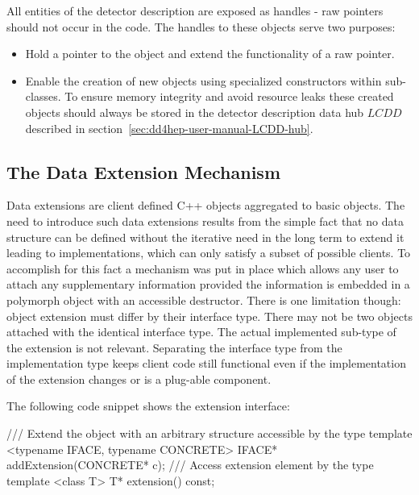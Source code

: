 \documentclass[10pt,a4paper]{article}
\begin{document}
\noindent
All entities of the \DDhep detector description are exposed as handles - 
raw pointers should not occur in the code. 
The handles to these objects serve two purposes:
\begin{itemize}\itemcompact
\item Hold a pointer to the object and extend the functionality of a raw
    pointer.
\item Enable the creation of new objects using specialized constructors
    within sub-classes. To ensure memory integrity and avoid resource 
    leaks these created objects should always be stored in the 
    detector description data hub $LCDD$ described in 
    section~\ref{sec:dd4hep-user-manual-LCDD-hub}.
\end{itemize}

\newpage
\subsection{The Data Extension Mechanism}
\label{sec:dd4hep-user-manual-data-extensions}
\noindent
Data extensions are client defined C++ objects aggregated to basic \DDhep objects.
The need to introduce such data extensions results from the simple fact that
no data structure can be defined without the iterative need in the long term
to extend it leading to implementations, which can only satisfy a subset of 
possible clients. To accomplish for this fact a mechanism was put in place
which allows any user to attach any supplementary information provided
the information is embedded in a polymorph object with an accessible destructor.
There is one limitation though: object extension must differ by their 
interface type. 
There may not be two objects attached with the identical interface type.
The actual implemented sub-type of the extension is not relevant.
Separating the interface type from the implementation type keeps client
code still functional even if the implementation of the extension changes 
or is a plug-able component.

\noindent
The following code snippet shows the extension interface:

\begin{code}
  /// Extend the object with an arbitrary structure accessible by the type
  template <typename IFACE, typename CONCRETE> IFACE* addExtension(CONCRETE* c);
  /// Access extension element by the type
  template <class T> T* extension() const;
\end{code}
\end{document}
